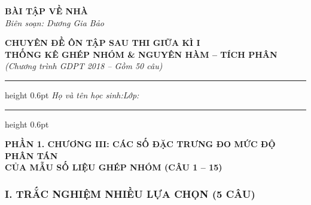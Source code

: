 \documentclass[12pt,a4paper]{article}
\begin{document}
\thispagestyle{firstpage}

\noindent
\begin{minipage}[t]{0.36\textwidth}
    \centering
    {\fontsize{12}{14}\selectfont\textbf{BÀI TẬP VỀ NHÀ}}\\[4pt]
    \textit{Biên soạn: Dương Gia Bảo}\\[6pt]
    \setlength{\fboxrule}{0.8pt}
    \setlength{\fboxsep}{5pt}
\end{minipage}\hfill
\begin{minipage}[t]{0.62\textwidth}
    \centering
    {\fontsize{13}{15}\selectfont\textbf{CHUYÊN ĐỀ ÔN TẬP SAU THI GIỮA KÌ I}}\\[3pt]
    {\fontsize{12}{14}\selectfont\textbf{THỐNG KÊ GHÉP NHÓM \& NGUYÊN HÀM -- TÍCH PHÂN}}\\[3pt]
    {\fontsize{11}{13}\selectfont\textit{(Chương trình GDPT 2018 -- Gồm 50 câu)}}
\end{minipage}

\par\vspace{4pt}
\hrule height 0.6pt
\vspace{4pt}
\noindent\textit{Họ và tên học sinh:}\dotfill\hspace{0.8cm}\textit{Lớp:}\makebox[3.2cm]{\dotfill}
\par\vspace{3pt}
\hrule height 0.6pt
\vspace{6pt}

\begin{center}
    {\fontsize{13}{15}\selectfont\textbf{PHẦN 1. CHƯƠNG III: CÁC SỐ ĐẶC TRƯNG ĐO MỨC ĐỘ PHÂN TÁN}}\\[2pt]
    {\fontsize{13}{15}\selectfont\textbf{CỦA MẪU SỐ LIỆU GHÉP NHÓM (CÂU 1 -- 15)}}
\end{center}

\subsubsection*{I. TRẮC NGHIỆM NHIỀU LỰA CHỌN (5 CÂU)}
\end{document}
